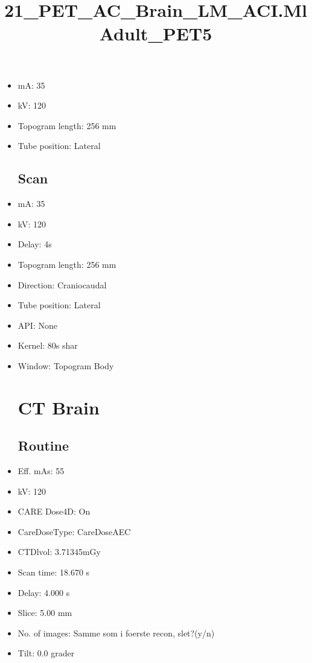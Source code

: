 \documentclass[12pt]{article}
\title{21\_PET\_AC\_Brain\_LM\_ACI.MlAdult\_PET5}
\begin{document}
\maketitle
\newpage
\tableofcontents
\newpage
{}


\begin{itemize}[noitemsep]\section{Topogram}
\subsection{Routine}
\item mA: 35\item kV: 120\item Topogram length: 256 mm\item Tube position: Lateral
\subsection{Scan}\item mA: 35\item kV: 120\item Delay: 4s\item Topogram length: 256 mm\item Direction: Craniocaudal\item Tube position: Lateral\item API: None\item Kernel: 80s shar\item Window: Topogram Body
\section{CT Brain }
\subsection{Routine}
\item Eff. mAs: 55\item kV: 120\item CARE Dose4D: On\item CareDoseType: CareDoseAEC\item CTDlvol: 3.71345mGy\item Scan time: 18.670 s\item Delay: 4.000 s\item Slice: 5.00 mm\item No. of images: Samme som i foerste recon, slet?(y/n)\item Tilt: 0.0 grader

\end{itemize}
\end{document}
